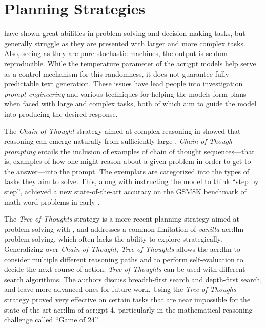 \section{Planning Strategies}\label{sec:planning-strategies}

 have shown great abilities in problem-solving and decision-making tasks, but generally struggle as they are presented with larger and more complex tasks. Also, seeing as they are pure stochastic machines, the output is seldom reproducible. While the temperature parameter of the \acrshort{acr:gpt} models help serve as a control mechanism for this randomness, it does not guarantee fully predictable text generation. These issues have lead people into investigation \textit{prompt engineering} and various techniques for helping the models form plans when faced with large and complex tasks, both of which aim to guide the model into producing the desired response.

The \textit{Chain of Thought} strategy \citep{weiChainofThoughtPromptingElicits2023} aimed at complex reasoning in  showed that reasoning can emerge naturally from sufficiently large .  \textit{Chain-of-Though prompting} entails the inclusion of examples of chain of thought sequences---that is, examples of how one might reason about a given problem in order to get to the answer---into the prompt. The exemplars are categorized into the types of tasks they aim to solve. This, along with instructing the model to think \enquote{step by step}, achieved a new state-of-the-art accuracy on the GSM8K benchmark of math word problems in early \citeyear{weiChainofThoughtPromptingElicits2023}.

The \textit{Tree of Thoughts} strategy \citep{yaoTreeThoughtsDeliberate2023} is a more recent planning strategy aimed at problem-solving with , and addresses a common limitation of \textit{vanilla} \acrshort{acr:llm} problem-solving, which often lacks the ability to explore strategically. Generalizing over \textit{Chain of Thought}, \textit{Tree of Thoughts} allows the \acrshort{acr:llm} to consider multiple different reasoning paths and to perform self-evaluation to decide the next course of action. \textit{Tree of Thoughts} can be used with different search algorithms. The authors discuss breadth-first search and depth-first search, and leave more advanced ones for future work. Using the \textit{Tree  of Thoughs} strategy proved very effective on certain tasks that are near impossible for the state-of-the-art \acrshort{acr:llm} of \acrshort{acr:gpt}-4, particularly in the mathematical reasoning challenge called \enquote{Game of 24}.

